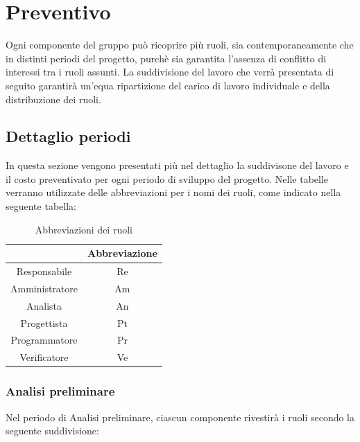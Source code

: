 \section{Preventivo} \label{section:preventivo}
Ogni componente del gruppo può ricoprire più ruoli, sia contemporaneamente che in distinti periodi del progetto, purchè sia garantita l'assenza di conflitto di interessi tra i ruoli assunti.
La suddivisione del lavoro che verrà presentata di seguito garantirà un'equa ripartizione del carico di lavoro individuale e della distribuzione dei ruoli.
\subsection{Dettaglio periodi} \label{subsection:preventivo_dettaglio_periodi}
In questa sezione vengono presentati più nel dettaglio la suddivisone del lavoro e il costo preventivato per ogni periodo di sviluppo del progetto. Nelle tabelle
verranno utilizzate delle abbreviazioni per i nomi dei ruoli, come indicato nella seguente tabella:

\begin{table}[H]
    \centering
    \renewcommand{\arraystretch}{1.8}
    \begin{tabular}{c|c}
      \rowcolor[HTML]{125E28} 
      \multicolumn{1}{c}{\color[HTML]{FFFFFF}\textbf{Ruolo}}
      & \multicolumn{1}{c}{\color[HTML]{FFFFFF}\textbf{Abbreviazione}}\\
      \hline
      Responsabile      & Re\\
      Amministratore    & Am\\
      Analista          & An\\
      Progettista       & Pt\\
      Programmatore     & Pr\\
      Verificatore      & Ve
    \end{tabular}
    \caption{Abbreviazioni dei ruoli}
  \end{table}

\pagebreak
\subsubsection{Analisi preliminare}
Nel periodo di Analisi preliminare, ciascun componente rivestirà i ruoli secondo la seguente suddivisione:

